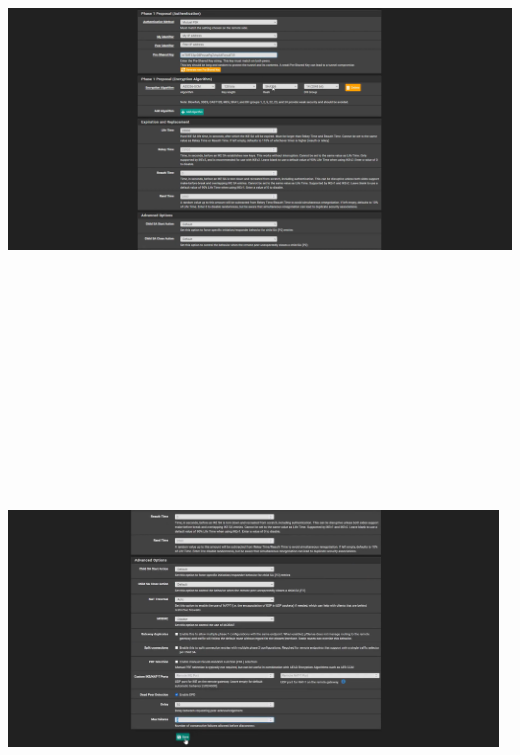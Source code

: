 \documentclass{article} %
\begin{document}
\noindent \includegraphics*[width=5.53in, height=5.27in, trim=2.69in 0.00in 2.78in 0.00in]{image32}

\noindent 

\noindent 

\noindent 

\noindent 

\noindent 

\noindent 

\noindent \includegraphics*[width=5.11in, height=4.75in, trim=2.39in 0.00in 2.20in 0.00in]{image33}
\end{document}
